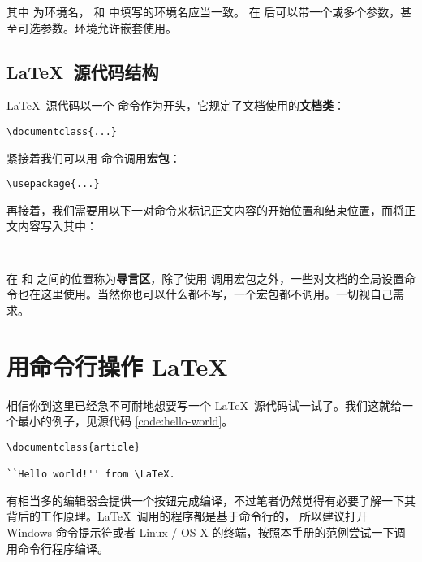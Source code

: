 其中  为环境名， 和  中填写的环境名应当一致。
 在  后可以带一个或多个参数，甚至可选参数。环境允许嵌套使用。

\subsection{\LaTeX\ 源代码结构}\label{subsec:struct}

\LaTeX\ 源代码以一个  命令作为开头，它规定了文档使用的\textbf{文档类}：
\begin{verbatim}
\documentclass{...}
\end{verbatim}

紧接着我们可以用  命令调用\textbf{宏包}：
\begin{verbatim}
\usepackage{...}
\end{verbatim}

再接着，我们需要用以下一对命令来标记正文内容的开始位置和结束位置，而将正文内容写入其中：
\begin{verbatim}


\end{verbatim}

在  和  之间的位置称为\textbf{导言区}，除了使用 
调用宏包之外，一些对文档的全局设置命令也在这里使用。当然你也可以什么都不写，一个宏包都不调用。一切视自己需求。

\section{用命令行操作 \LaTeX}

相信你到这里已经急不可耐地想要写一个 \LaTeX\ 源代码试一试了。我们这就给一个最小的例子，见源代码 \ref{code:hello-world}。

\begin{sourcecode}[hbp]
\begin{Verbatim}
\documentclass{article}

``Hello world!'' from \LaTeX.

\end{Verbatim}
\caption{\LaTeX\ 的一个最简单的源代码示例。}\label{code:hello-world}
\end{sourcecode}

有相当多的编辑器会提供一个按钮完成编译，不过笔者仍然觉得有必要了解一下其背后的工作原理。\LaTeX\ 调用的程序都是基于命令行的，
所以建议打开 Windows 命令提示符或者 Linux / OS X 的终端，按照本手册的范例尝试一下调用命令行程序编译。

